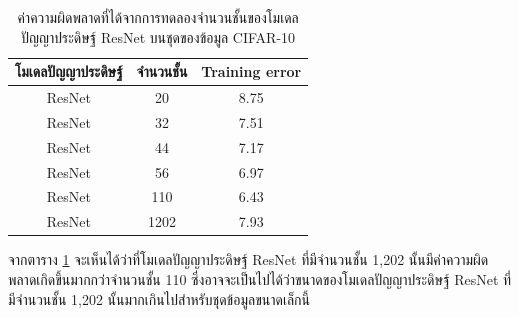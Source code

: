 \begin{table}[!ht]
	\centering
	\begin{tabular}{|c|c|c|}
		\hline
		{โมเดลปัญญาประดิษฐ์}		  &{จำนวนชั้น}				    &{Training error}	\\
		\hline
		ResNet						& 20						& 8.75				\\
		ResNet						& 32						& 7.51				\\
		ResNet						& 44						& 7.17				\\
		ResNet						& 56						& 6.97				\\
		ResNet						& 110						& 6.43				\\
		ResNet						& 1202						& 7.93				\\
		\hline
	\end{tabular}
	\caption{ค่าความผิดพลาดที่ได้จากการทดลองจำนวนชั้นของโมเดลปัญญาประดิษฐ์ ResNet บนชุดของข้อมูล CIFAR-10}
	\label{tab: หมวดหมู่ification error}
\end{table}
จากตาราง \ref{tab: หมวดหมู่ification error} จะเห็นได้ว่าที่โมเดลปัญญาประดิษฐ์ ResNet ที่มีจำนวนชั้น 1,202 
นั้นมีค่าความผิดพลาดเกิดขึ้นมากกว่าจำนวนชั้น 110 ซึ่งอาจจะเป็นไปได้ว่าขนาดของโมเดลปัญญาประดิษฐ์ ResNet ที่มีจำนวนชั้น 1,202 
นั้นมากเกินไปสำหรับชุดข้อมูลขนาดเล็กนี้